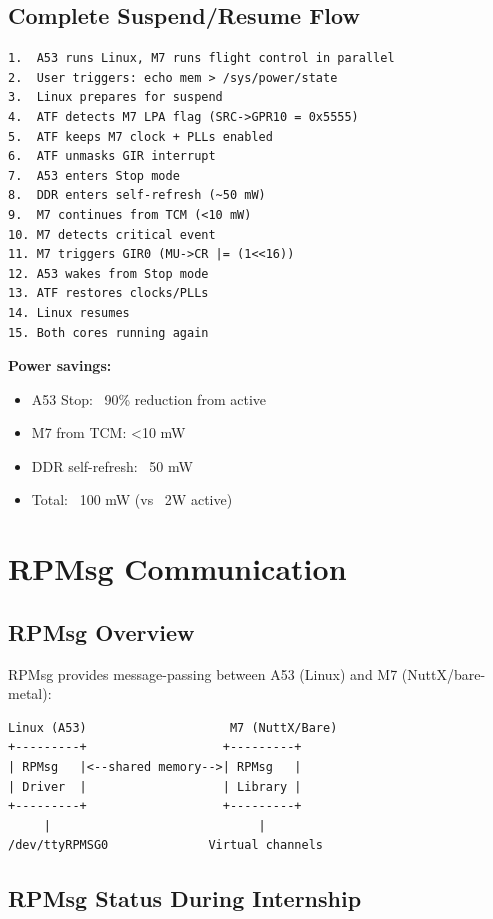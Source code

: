 \documentclass[12pt,a4paper]{report}
\begin{document}
\subsection{Complete Suspend/Resume Flow}

\begin{verbatim}
1.  A53 runs Linux, M7 runs flight control in parallel
2.  User triggers: echo mem > /sys/power/state
3.  Linux prepares for suspend
4.  ATF detects M7 LPA flag (SRC->GPR10 = 0x5555)
5.  ATF keeps M7 clock + PLLs enabled
6.  ATF unmasks GIR interrupt
7.  A53 enters Stop mode
8.  DDR enters self-refresh (~50 mW)
9.  M7 continues from TCM (<10 mW)
10. M7 detects critical event
11. M7 triggers GIR0 (MU->CR |= (1<<16))
12. A53 wakes from Stop mode
13. ATF restores clocks/PLLs
14. Linux resumes
15. Both cores running again
\end{verbatim}

\textbf{Power savings:}
\begin{itemize}
    \item A53 Stop: ~90\% reduction from active
    \item M7 from TCM: <10 mW
    \item DDR self-refresh: ~50 mW
    \item Total: ~100 mW (vs ~2W active)
\end{itemize}

\section{RPMsg Communication}

\subsection{RPMsg Overview}

RPMsg provides message-passing between A53 (Linux) and M7 (NuttX/bare-metal):

\begin{verbatim}
Linux (A53)                    M7 (NuttX/Bare)
+---------+                   +---------+
| RPMsg   |<--shared memory-->| RPMsg   |
| Driver  |                   | Library |
+---------+                   +---------+
     |                             |
/dev/ttyRPMSG0              Virtual channels
\end{verbatim}

\subsection{RPMsg Status During Internship}
\end{document}
